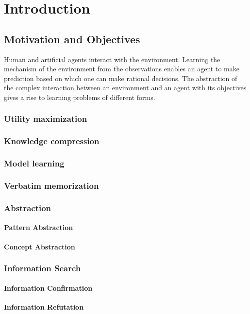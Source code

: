 
\chapter{Introduction}

\section{Motivation and Objectives}
Human and artificial agents interact with the environment. Learning the mechanism of the environment from the observations enables an agent to make prediction based on which one can make rational decisions. The abstraction of the complex interaction between an environment and an agent with its objectives gives a rise to learning problems of different forms.

\subsection{Utility maximization}
\subsection{Knowledge compression}
\subsection{Model learning}
\subsection{Verbatim memorization}
\subsection{Abstraction}
\subsubsection{Pattern Abstraction}
\subsubsection{Concept Abstraction}
\subsection{Information Search}
\subsubsection{Information Confirmation}
\subsubsection{Information Refutation}

